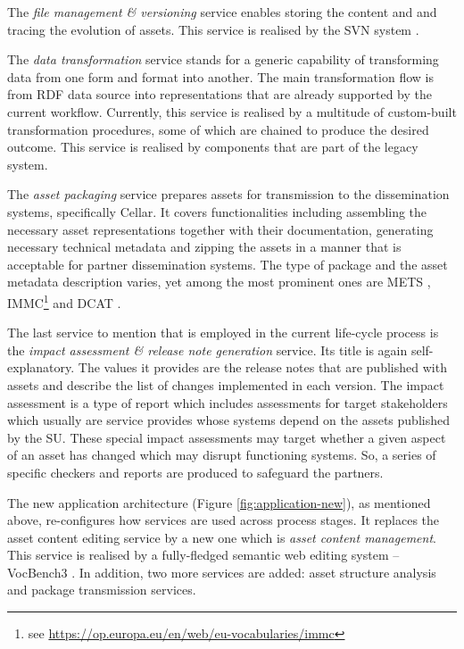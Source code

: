 	The \textit{file management \& versioning} service enables storing the content and and tracing the evolution of assets. This service is realised by the SVN system \cite{svn}.
	
	The \textit{data transformation} service stands for a generic capability of transforming data from one form and format into another. The main transformation flow is from RDF data source into representations that are already supported by the current workflow. Currently, this service is realised by a multitude of custom-built transformation procedures, some of which are chained to produce the desired outcome. This service is realised by components that are part of the legacy system. 
	
	The \textit{asset packaging} service prepares assets for transmission to the dissemination systems, specifically Cellar. It covers functionalities including assembling the necessary asset representations together with their documentation, generating necessary technical metadata and zipping the assets in a manner that is acceptable for partner dissemination systems. The type of package and the asset metadata description varies, yet among the most prominent ones are METS \citep{mets}, IMMC\footnote{see \url{https://op.europa.eu/en/web/eu-vocabularies/immc}} and DCAT \cite{dcat2}.
	
	\enlargethispage{1em}
	
	The last service to mention that is employed in the current life-cycle process is the \textit{impact assessment \& release note generation} service. Its title is again self-explanatory. The values it provides are the release notes that are published with assets and describe the list of changes implemented in each version. The impact assessment is a type of report which includes assessments for target stakeholders which usually are service provides whose systems depend on the assets published by the SU. These special impact assessments may target whether a given aspect of an asset has changed which may disrupt functioning systems. So, a series of specific checkers and reports are produced to safeguard the partners. 
	
	The new application architecture (Figure \ref{fig:application-new}), as mentioned above, re-configures how services are used across process stages. It replaces the asset content editing service by a new one which is \textit{asset content management}. This service is realised by a fully-fledged semantic web editing system -- VocBench3 \citep{stellatovocbench}. In addition, two more services are added: asset structure analysis and package transmission services.
	
